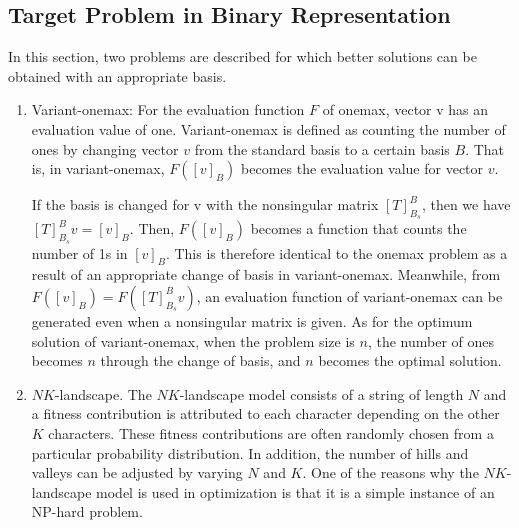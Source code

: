 \subsection{Target Problem in Binary Representation}
In this section, two problems are described for which better solutions can be obtained with an appropriate basis.
\begin{enumerate}
	\item  Variant-onemax: For the evaluation function $ F $ of onemax, vector v has an evaluation value of one. Variant-onemax is defined as counting the number of ones by changing vector $ v $ from the standard basis to a certain basis $ B $. That is, in variant-onemax, $ F\left(\left[v\right]_B\right) $ becomes the evaluation value for vector $ v $.
	
	If the basis is changed for v with the nonsingular matrix $ \left[T\right]_{B_s}^B $, then we have $ \left[T\right]_{B_s}^Bv=\left[v\right]_B $. Then, $ F\left(\left[v\right]_B\right) $ becomes a function that counts the number of 1s in $ \left[v\right]_B $. This is therefore identical to the onemax problem as a result of an appropriate change of basis in variant-onemax. Meanwhile, from $ F\left(\left[v\right]_B\right)=F\left(\left[T\right]_{B_s}^Bv\right) $, an evaluation function of variant-onemax can be generated even when a nonsingular matrix is given. As for the optimum solution of variant-onemax, when the problem size is $ n $, the number of ones becomes $ n $ through the change of basis, and $ n $ becomes the optimal solution.
	
	\item $ NK $-landscape. The $ NK $-landscape model consists of a string of length $ N $ and a fitness contribution is attributed to each character depending on the other $ K $ characters. These fitness contributions are often randomly chosen from a particular probability distribution. In addition, the number of hills and valleys can be adjusted by varying $ N $ and $ K $. One of the reasons why the $ NK $-landscape model is used in optimization is that it is a simple instance of an NP-hard problem.
	
\end{enumerate}

